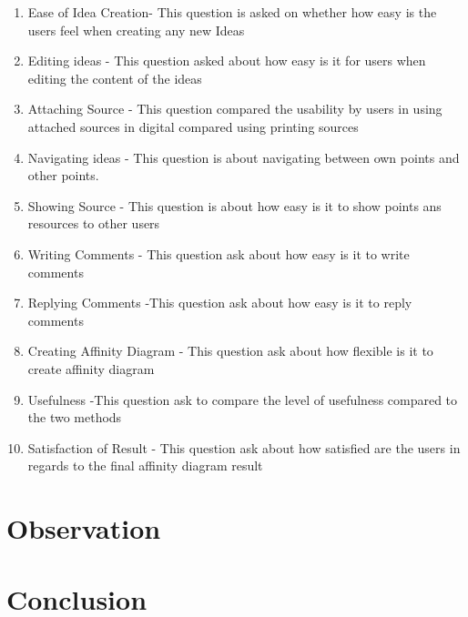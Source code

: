 \documentclass{sigchi}
\begin{document}
\begin{itemize}
\begin{itemize}
\begin{enumerate}
  \item Ease of Idea Creation- This question is asked on whether how easy is the users feel when creating any new Ideas 
  \item Editing ideas - This question asked about how easy is it for users when editing the content of the ideas 
  \item Attaching Source - This question compared the  usability by users in using attached sources in digital compared using printing sources 
  \item Navigating ideas - This question is about navigating between own points and other points. 
  \item Showing Source - This question is about how easy is it to show points ans resources to other users 
  \item Writing Comments - This question ask about how easy is it to write comments 
  \item Replying Comments -This question ask about how easy is it to reply  comments 
  \item Creating Affinity Diagram - This question ask about how flexible is it to create affinity diagram 
  \item Usefulness -This question ask to compare the level of usefulness compared to the two methods  
  \item Satisfaction of Result - This question ask about how satisfied are the users in regards to the final affinity diagram result   
\end{enumerate}



\section{Observation}





\section{Conclusion}


\end{itemize}
\end{itemize}
\end{document}
